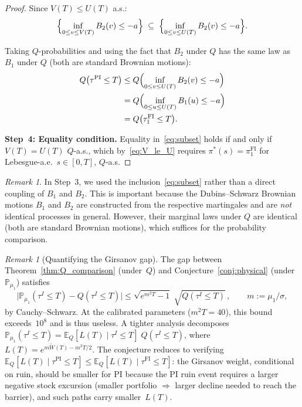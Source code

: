 \documentclass[12pt]{article}
\theoremstyle{remark}
\newtheorem{remark}[theorem]{Remark}
\theoremstyle{definition}
\newcommand{\E}{\mathbb{E}}
\newcommand{\Prob}{\mathbb{P}}
\newcommand{\FI}{\mathrm{FI}}
\newcommand{\PI}{\mathrm{PI}}
\begin{document}
\begin{proof}
Since $V(T) \le U(T)$ a.s.:
\begin{equation}\label{eq:subset}
  \Bigl\{\inf_{0 \le v \le V(T)} B_2(v) \le -a\Bigr\}
  \;\subseteq\;
  \Bigl\{\inf_{0 \le v \le U(T)} B_2(v) \le -a\Bigr\}.
\end{equation}

Taking $Q$-probabilities and using the fact that $B_2$ under $Q$ has
the same law as $B_1$ under $Q$ (both are standard Brownian motions):
\begin{align}
  Q\bigl(\tau^{\PI} \le T\bigr)
  &\le Q\Bigl(\inf_{0 \le v \le U(T)} B_2(v) \le -a\Bigr) \notag \\
  &= Q\Bigl(\inf_{0 \le u \le U(T)} B_1(u) \le -a\Bigr) \notag \\
  &= Q\bigl(\tau_1^{\FI} \le T\bigr).
  \label{eq:Q_comparison_chain}
\end{align}

\medskip
\noindent\textbf{Step~4: Equality condition.}
Equality in~\eqref{eq:subset} holds if and only if $V(T) = U(T)$
$Q$-a.s., which by~\eqref{eq:V_le_U} requires
$\pi^*(s) = \pi_1^{\FI}$ for Lebesgue-a.e.\ $s \in [0,T]$, $Q$-a.s.
\end{proof}

\begin{remark}\label{rem:DS_subtlety}
In Step~3, we used the inclusion~\eqref{eq:subset} rather than a
direct coupling of $B_1$ and $B_2$.
This is important because the Dubins--Schwarz Brownian motions $B_1$
and $B_2$ are constructed from the respective martingales and are
\emph{not} identical processes in general.
However, their marginal laws under $Q$ are identical (both are standard
Brownian motions), which suffices for the probability comparison.
\end{remark}

\begin{remark}[Quantifying the Girsanov gap]\label{rem:girsanov_gap}
The gap between Theorem~\ref{thm:Q_comparison} (under~$Q$) and
Conjecture~\ref{conj:physical} (under $\Prob_{\mu_1}$) satisfies
\[
  \bigl|\Prob_{\mu_1}(\tau^I \le T) - Q(\tau^I \le T)\bigr|
  \le \sqrt{e^{m^2 T} - 1}\;\sqrt{Q(\tau^I \le T)}\,,
  \qquad m := \mu_1/\sigma,
\]
by Cauchy--Schwarz.
At the calibrated parameters ($m^2 T = 40$), this bound exceeds~$10^8$
and is thus useless.
A tighter analysis decomposes
$\Prob_{\mu_1}(\tau^I \le T)
  = \E_Q[L(T) \mid \tau^I \le T]\;Q(\tau^I \le T)$,
where $L(T) = e^{m\widetilde{W}(T) - m^2 T/2}$.
The conjecture reduces to verifying
$\E_Q[L(T) \mid \tau^{\PI} \le T] \le \E_Q[L(T) \mid \tau^{\FI} \le T]$:
the Girsanov weight, conditional on ruin, should be smaller for PI
because the PI ruin event requires a larger negative stock excursion
(smaller portfolio $\Rightarrow$ larger decline needed to reach the
barrier), and such paths carry smaller~$L(T)$.
\end{remark}
\end{document}
